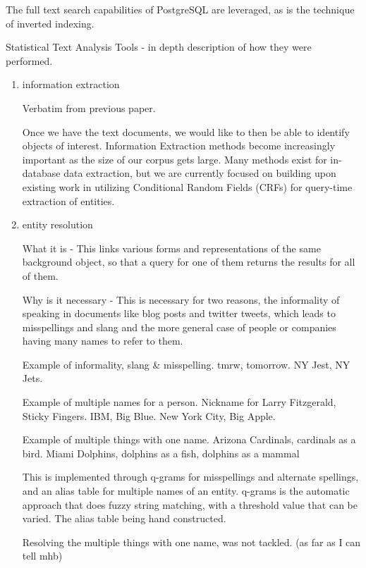 \documentclass{article}
\begin{document}
\begin{enumerate}
\begin{enumerate}
    The full text search capabilities of PostgreSQL are leveraged,
    as is the technique of inverted indexing.


    Statistical Text Analysis Tools - in depth description of how they were performed.
    \begin{enumerate}
    \item information extraction

      Verbatim from previous paper.

      Once we have the text documents, we would like to then be able to identify
      objects of interest. Information Extraction methods become increasingly
      important as the size of our corpus gets large. Many methods exist for in-database data
      extraction, but we are currently focused on building upon existing work in
      utilizing Conditional Random Fields (CRFs) for query-time extraction of
      entities.

    \item entity resolution

      What it is -
      This links various forms and representations of the same background object,
      so that a query for one of them returns the results for all of them.

      Why is it necessary -
      This is necessary for two reasons,
      the informality of speaking in documents like blog posts and twitter tweets,
      which leads to misspellings and slang
      and the more  general case of people or companies having many names to refer to them.

      Example of informality, slang \& misspelling. tmrw, tomorrow. NY Jest, NY Jets.

      Example of multiple names for a person. Nickname for Larry Fitzgerald, Sticky Fingers. IBM, Big Blue. New York City, Big Apple.

      Example of multiple things with one name.
      Arizona Cardinals, cardinals as a bird.
      Miami Dolphins, dolphins as a fish, dolphins as a mammal

      This is implemented through q-grams for misspellings and alternate spellings,
      and an alias table for multiple names of an entity.
      q-grams is the automatic approach that does fuzzy string matching,
      with a threshold value that can be varied.
      The alias table being hand constructed.

      Resolving the multiple things with one name, was not tackled. (as far as I can tell mhb)


\end{enumerate}
\end{enumerate}
\end{enumerate}
\end{document}
